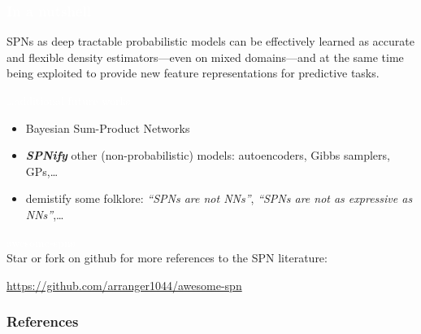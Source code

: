 \documentclass[xcolor={usenames,dvipsnames,svgnames}, compress]{beamer}
\newcommand{\highlighttext}[2][yellow]{{\colorbox{#1}{\textcolor{white}{#2}}}}
\begin{document}
\begin{frame}[t]
  \frametitle{\highlighttext[yellow4]{In a nutshell}}
  \footnotesize
  SPNs as deep tractable probabilistic models can be effectively
  learned as accurate and flexible density estimators---even on mixed domains---and
  at the same time being exploited to provide new feature
  representations for predictive tasks.\par\bigskip

  {
    \highlighttext[tomato4]{\dots additional future works}}\\[3pt]
  \begin{itemize}
  \setlength{\itemsep}{0pt}  
\item Bayesian Sum-Product Networks
\item \emph{\textbf{SPNify}} other (non-probabilistic) models: autoencoders, Gibbs
  samplers, GPs,\dots
  \item demistify some folklore: \emph{``SPNs are not NNs''}, \emph{``SPNs
    are not as expressive as NNs''},\dots
\end{itemize}\vspace{7pt}

{
    \highlighttext[peas1]{awesome-spns}}\\[3pt]
  Star or fork on github for more references to the SPN literature:\vspace{-5pt}
  \begin{center}
    \large\url{https://github.com/arranger1044/awesome-spn}
  \end{center}\par\bigskip
\end{frame}




 
\begin{frame}[allowframebreaks]
  \frametitle{References}
  \setlength\bibitemsep{8pt}
  \printbibliography
\end{frame}
\end{document}
